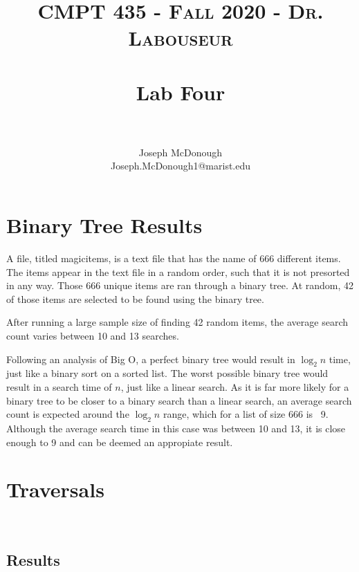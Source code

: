 \documentclass[letterpaper, 10pt,DIV=13]{scrartcl}
\title{	
   \normalfont \normalsize 
   \textsc{CMPT 435 - Fall 2020 - Dr. Labouseur} \\[10pt] %
   \horrule{0.5pt} \\[0.25cm] 	%
   \huge Lab Four  \\     	    %
   \horrule{0.5pt} \\[0.25cm] 	%
}
\author{Joseph McDonough \\ \normalsize Joseph.McDonough1@marist.edu}
\date{\normalize{November 13, 2020}}	%
\numberwithin{equation}{section} %
\numberwithin{figure}{section} %
\numberwithin{table}{section} %
\begin{document}
\maketitle %


\section{Binary Tree Results}
A file, titled magicitems, is a text file that has the name of 666 different items.  The items appear in the text file in a random order, such that it is not presorted in any way. Those 666 unique items are ran through a binary tree.  At random, 42 of those items are selected to be found using the binary tree.  

After running a large sample size of finding 42 random items, the average search count varies between 10 and 13 searches.  

Following an analysis of Big O, a perfect binary tree would result in $\log_2 n$ time, just like a binary sort on a sorted list.  The worst possible binary tree would result in a search time of $n$, just like a linear search.  As it is far more likely for a binary tree to be closer to a binary search than a linear search, an average search count is expected around the $\log_2 n$ range, which for a list of size 666 is ~9.  Although the average search time in this case was between 10 and 13, it is close enough to 9 and can be deemed an appropiate result.

\section{Traversals} \\

\subsection{Results}
\end{document}
